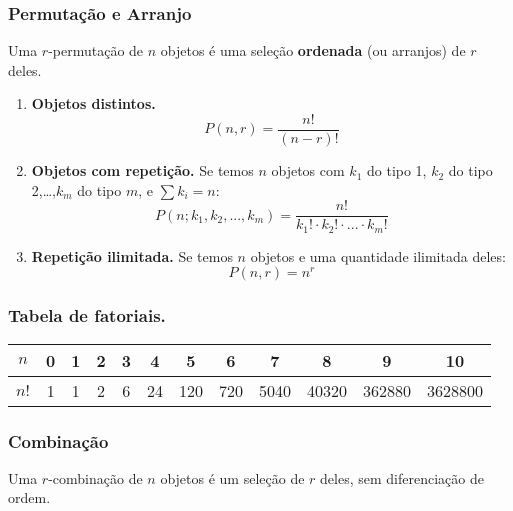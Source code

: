 \subsubsection{Permutação e Arranjo}
Uma $r$-permutação de $n$ objetos é uma seleção \textbf{ordenada} (ou arranjos) de $r$ deles.

\begin{enumerate}
    \item \textbf{Objetos distintos.} 
    $$P(n,r) = \frac{n!}{(n-r)!}$$

    \item \textbf{Objetos com repetição.} Se temos $n$ objetos com $k_1$ do tipo 1, $k_2$ do tipo 2,\dots,$k_m$ do tipo $m$, e $\sum k_i = n$:
    $$P(n;k_1,k_2,...,k_m) = \frac{n!}{k_1!\cdot k_2!\cdot ... \cdot k_m!}$$

    \item \textbf{Repetição ilimitada.} Se temos $n$ objetos e uma quantidade ilimitada deles:
    $$P(n,r) = n^r$$
\end{enumerate}

\subsubsection*{Tabela de fatoriais.}

\begin{center}
    \begin{tabular}{|c | c c c c c c c c c c c |}
    	$n$ & 0 &1& 2& 3& 4& 5& 6& 7& 8& 9& 10 \\
    	\hline
    	$n!$ & 1& 1& 2& 6& 24& 120& 720& 5040& 40320& 362880& 3628800 \\
    \end{tabular}
\end{center}

\subsubsection{Combinação}
Uma $r$-combinação de $n$ objetos é um seleção de $r$ deles, sem diferenciação de ordem.

